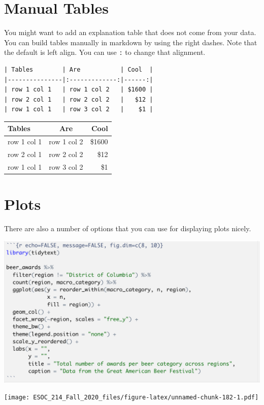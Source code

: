 \documentclass[
]{book}
\begin{document}
\hypertarget{manual-tables}{%
\section{Manual Tables}\label{manual-tables}}

You might want to add an explanation table that does not come from your data. You can build tables manually in markdown by using the right dashes. Note that the default is left align. You can use \texttt{:} to change that alignment.

\begin{verbatim}
| Tables        | Are           | Cool  |
|---------------|:-------------:|------:|
| row 1 col 1   | row 1 col 2   | $1600 |
| row 2 col 1   | row 2 col 2   |   $12 |
| row 1 col 1   | row 3 col 2   |    $1 |
\end{verbatim}

\begin{longtable}[]{@{}lcr@{}}
\toprule
Tables & Are & Cool\tabularnewline
\midrule
\endhead
row 1 col 1 & row 1 col 2 & \$1600\tabularnewline
row 2 col 1 & row 2 col 2 & \$12\tabularnewline
row 1 col 1 & row 3 col 2 & \$1\tabularnewline
\bottomrule
\end{longtable}

\hypertarget{plots}{%
\section{Plots}\label{plots}}

There are also a number of options that you can use for displaying plots nicely.

\includegraphics[width=20.39in]{images/nice_plot}

\texttt{[image: ESOC\_214\_Fall\_2020\_files/figure-latex/unnamed-chunk-182-1.pdf]}
\end{document}
